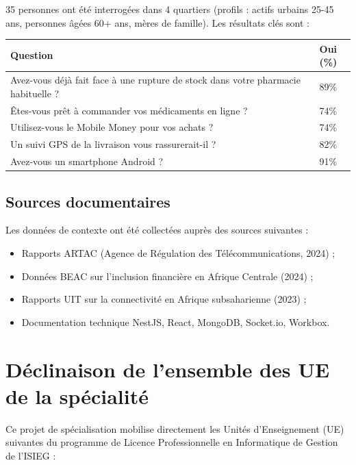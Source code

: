 \documentclass[12pt,a4paper,oneside]{report}
\begin{document}
35 personnes ont été interrogées dans 4 quartiers (profils : actifs urbains 25-45 ans, personnes âgées 60+ ans, mères de famille). Les résultats clés sont :

\begin{center}
\begin{tabular}{lc}
  \toprule
  \textbf{Question} & \textbf{Oui (\%)} \\
  \midrule
  Avez-vous déjà fait face à une rupture de stock dans votre pharmacie habituelle ? & 89\% \\
  Êtes-vous prêt à commander vos médicaments en ligne ? & 74\% \\
  Utilisez-vous le Mobile Money pour vos achats ? & 74\% \\
  Un suivi GPS de la livraison vous rassurerait-il ? & 82\% \\
  Avez-vous un smartphone Android ? & 91\% \\
  \bottomrule
\end{tabular}
\end{center}

\subsection{Sources documentaires}

Les données de contexte ont été collectées auprès des sources suivantes :
\begin{itemize}
  \item Rapports ARTAC (Agence de Régulation des Télécommunications, 2024) ;
  \item Données BEAC sur l'inclusion financière en Afrique Centrale (2024) ;
  \item Rapports UIT sur la connectivité en Afrique subsaharienne (2023) ;
  \item Documentation technique NestJS, React, MongoDB, Socket.io, Workbox.
\end{itemize}

\section{Déclinaison de l'ensemble des UE de la spécialité}

Ce projet de spécialisation mobilise directement les Unités d'Enseignement (UE) suivantes du programme de Licence Professionnelle en Informatique de Gestion de l'ISIEG :
\end{document}
